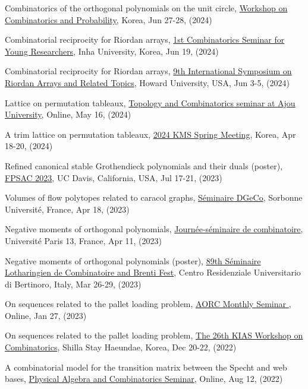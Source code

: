 \documentclass[letterpaper]{article}
\begin{document}
\begin{etaremune}
\item Combinatorics of the orthogonal polynomials on the unit circle, \href{http://events.kias.re.kr/h/CombinatoricsProbability/?pageNo=5480}{Workshop on Combinatorics and Probability}, Korea, Jun 27-28, (2024)
\item Combinatorial reciprocity for Riordan arrays, \href{https://sites.google.com/view/csyr/1st?authuser=0}{1st Combinatorics Seminar for Young Researchers}, Inha University, Korea, Jun 19, (2024)
\item Combinatorial reciprocity for Riordan arrays, \href{https://www.riordanarray.org/}{9th International Symposium on Riordan Arrays and Related Topics}, Howard University, USA, Jun 3-5, (2024)
\item Lattice on permutation tableaux, \href{https://sites.google.com/ajou.ac.kr/tcseminar/}{Topology and Combinatorics seminar at Ajou University}, Online, May 16, (2024)
\item A trim lattice on permutation tableaux, \href{https://www.kms.or.kr/conference/2024_spring/}{2024 KMS Spring Meeting}, Korea, Apr 18-20, (2024)
\item Refined canonical stable Grothendieck polynomials and their duals (poster), \href{http://fpsac23.math.ucdavis.edu/}{FPSAC 2023}, UC Davis, California, USA, Jul 17-21, (2023)
\item Volumes of flow polytopes related to caracol graphs, \href{https://dgeco.math.cnrs.fr/}{Séminaire DGeCo}, Sorbonne Université, France, Apr 18, (2023)
\item Negative moments of orthogonal polynomials, \href{https://lipn.fr/~banderier/Seminaires/}{Journée-séminaire de combinatoire}, Université Paris 13, France, Apr 11, (2023)
\item Negative moments of orthogonal polynomials (poster), \href{https://events.unibo.it/combinatorics}{89th Séminaire Lotharingien de Combinatoire and Brenti Fest}, Centro Residenziale Universitario di Bertinoro, Italy, Mar 26-29, (2023)
\item On sequences related to the pallet loading problem, \href{https://swb.skku.edu/aorc/seminar.do?mode=view&articleNo=39837&article.offset=0&articleLimit=10}{AORC Monthly Seminar }, Online, Jan 27, (2023)
\item On sequences related to the pallet loading problem, \href{http://events.kias.re.kr/h/combinatorics/?pageNo=4839}{The 26th KIAS Workshop on Combinatorics}, Shilla Stay Haeundae, Korea, Dec 20-22, (2022)
\item A combinatorial model for the transition matrix between the Specht and web bases, \href{https://tscrim.github.io/pacs_en.html}{Physical Algebra and Combinatorics Seminar}, Online, Aug 12, (2022)

\end{etaremune}
\end{document}
